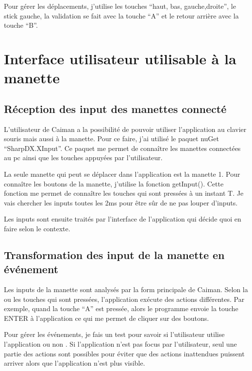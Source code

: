 \documentclass[a4paper,12pt,french]{sphinxmanual}
\begin{document}
\sphinxAtStartPar
Pour gérer les déplacements, j’utilise les touches “haut, bas, gauche,droite”, le stick gauche, la validation se fait avec la touche “A” et le retour arrière avec la touche “B”.


\section{Interface utilisateur utilisable à la manette}
\label{\detokenize{fonctionnelle:interface-utilisateur-utilisable-a-la-manette}}

\subsection{Réception des input des manettes connecté}
\label{\detokenize{fonctionnelle:reception-des-input-des-manettes-connecte}}
\sphinxAtStartPar
L’utilisateur de Caiman a la possibilité de pouvoir utiliser l’application au clavier souris mais aussi à la manette. Pour ce faire, j’ai utilisé le paquet nuGet “SharpDX.XInput”. Ce paquet me permet de connaître les manettes connectées au pc ainsi que les touches appuyées par l’utilisateur.

\sphinxAtStartPar
La seule manette qui peut se déplacer dans l’application est la manette 1. Pour connaître les boutons de la manette, j’utilise la fonction getInput(). Cette fonction me permet de connaître les touches qui sont pressées à un instant T.  Je vais chercher les inputs toutes les 2ms pour être sûr de ne pas louper d’inputs.

\sphinxAtStartPar
Les inputs sont ensuite traités par l’interface de l’application qui décide quoi en faire selon le contexte.


\subsection{Transformation des input de la manette en événement}
\label{\detokenize{fonctionnelle:transformation-des-input-de-la-manette-en-evenement}}
\sphinxAtStartPar
Les inputs de la manette sont analysés par la form principale de Caiman. Selon la ou les touches qui sont pressées, l’application exécute des actions différentes. Par exemple, quand la touche “A” est pressée, alors le programme envoie la touche ENTER à l’application ce qui me permet de cliquer sur des boutons.

\sphinxAtStartPar
Pour gérer les événements, je fais un test pour savoir si l’utilisateur utilise l’application ou non . Si l’application n’est pas focus par l’utilisateur, seul une partie des actions sont possibles pour éviter que des actions inattendues puissent arriver alors que l’application n’est plus visible.
\end{document}

